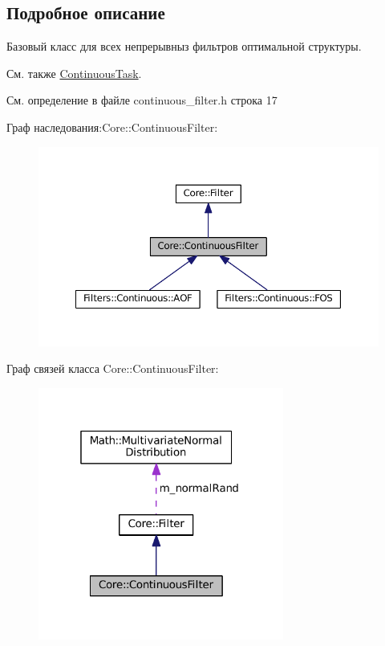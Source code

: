 \subsection{Подробное описание}
Базовый класс для всех непрерывныз фильтров оптимальной структуры. 

\begin{DoxySeeAlso}{См. также}
\hyperlink{class_core_1_1_continuous_task}{Continuous\+Task}. 
\end{DoxySeeAlso}


См. определение в файле continuous\+\_\+filter.\+h строка 17



Граф наследования\+:Core\+:\+:Continuous\+Filter\+:
\nopagebreak
\begin{figure}[H]
\begin{center}
\leavevmode
\includegraphics[width=350pt]{class_core_1_1_continuous_filter__inherit__graph}
\end{center}
\end{figure}


Граф связей класса Core\+:\+:Continuous\+Filter\+:
\nopagebreak
\begin{figure}[H]
\begin{center}
\leavevmode
\includegraphics[width=229pt]{class_core_1_1_continuous_filter__coll__graph}
\end{center}
\end{figure}


